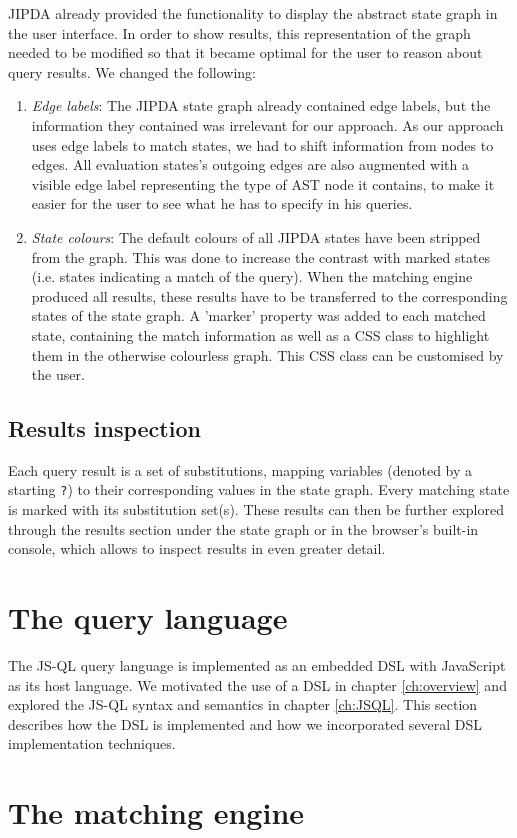 JIPDA already provided the functionality to display the abstract state graph in the user interface. In order to show results, this representation of the graph needed to be modified so that it became optimal for the user to reason about query results. We changed the following:
\begin{enumerate}
\item \textit{Edge labels}: The JIPDA state graph already contained edge labels, but the information they contained was irrelevant for our approach. As our approach uses edge labels to match states, we had to shift information from nodes to edges. All evaluation states's outgoing edges are also augmented with a visible edge label representing the type of AST node it contains, to make it easier for the user to see what he has to specify in his queries.
\item \textit{State colours}: The default colours of all JIPDA states have been stripped from the graph. This was done to increase the contrast with marked states (i.e. states indicating a match of the query). When the matching engine produced all results, these results have to be transferred to the corresponding states of the state graph. A 'marker' property was added to each matched state, containing the match information as well as a CSS class to highlight them in the otherwise colourless graph. This CSS class can be customised by the user.
\end{enumerate}

\subsection*{Results inspection}

Each query result is a set of substitutions, mapping variables (denoted by a starting \texttt{?}) to their corresponding values in the state graph. Every matching state is marked with its substitution set(s). These results can then be further explored through the results section under the state graph or in the browser's built-in console, which allows to inspect results in even greater detail.


\section{The query language}
The JS-QL query language is implemented as an embedded DSL with JavaScript as its host language. We motivated the use of a DSL in chapter \ref{ch:overview} and explored the JS-QL syntax and semantics in chapter \ref{ch:JSQL}. This section describes how the DSL is implemented and how we incorporated several DSL implementation techniques.


\section{The matching engine}



